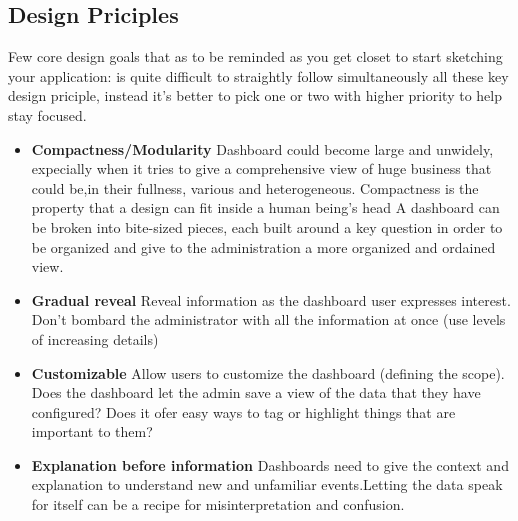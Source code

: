 \documentclass[a4paper,12pt]{report}
\begin{document}
\subsection{Design Priciples}
Few core design goals that as to be reminded as you get closet to start sketching your application: is quite difficult to straightly follow simultaneously all these key design priciple, instead it's better to pick one or two with higher priority to help stay focused.
\begin{itemize}
    \item \textbf{Compactness/Modularity}\newline
    Dashboard could become large and unwidely, expecially when it tries to give a comprehensive view of huge business that could be,in their fullness, various and heterogeneous. Compactness is the property that a design can fit inside a human being's head
    A dashboard can be broken into bite-sized pieces, each built around a key question in order to be organized and give to the administration a more organized and ordained view.
    \item \textbf{Gradual reveal}\newline
    Reveal information as the dashboard user expresses interest. Don't bombard the administrator with all the information at once (use levels of increasing details)
    \item \textbf{Customizable}\newline   
    Allow users to customize the dashboard (defining the scope). 
    Does the dashboard let the admin save a view of the data that they have configured? \newline
    Does it ofer easy ways to tag or highlight things that are important to them?
    \item \textbf{Explanation before information}\newline
    Dashboards need to give the context and explanation to understand new and unfamiliar events.Letting the data speak for itself can be a recipe for misinterpretation and confusion.
\end{itemize}
\end{document}
